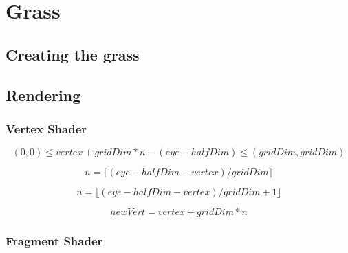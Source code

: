 \chapter{Grass}



\section{Creating the grass}

\section{Rendering}

\subsection{Vertex Shader}


\begin{displaymath}
  (0, 0) \le vertex + gridDim * n - (eye - halfDim) \le (gridDim, gridDim)
\end{displaymath}

\begin{displaymath}
  n = \lceil (eye - halfDim - vertex) / gridDim \rceil
\end{displaymath}

\begin{displaymath}
  n = \lfloor (eye - halfDim - vertex) / gridDim + 1 \rfloor
\end{displaymath}

\begin{displaymath}
  newVert = vertex + gridDim * n
\end{displaymath}






\subsection{Fragment Shader}







